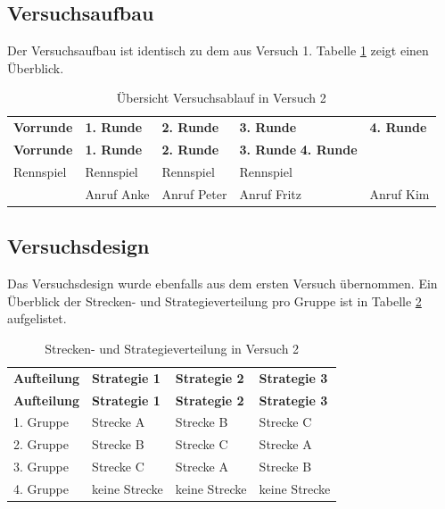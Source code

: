 \documentclass[12pt,a4paper]{scrartcl}
\begin{document}
\subsection{Versuchsaufbau}
Der Versuchsaufbau ist identisch zu dem aus Versuch 1.
Tabelle \ref{ablauf} zeigt einen Überblick.

\begin{longtable}{p{}p{}p{}p{}p{} }
	\label{ablauf}\\
	\caption[Übersicht Versuchsablauf in Versuch 2]{Übersicht Versuchsablauf in Versuch 2}\\
	\hline
	\textbf{Vorrunde}&\textbf{1. Runde}&\textbf{2. Runde} &\textbf{3. Runde} & \textbf{4. Runde}\\
	\hline
	\endfirsthead
	\hline
	\textbf{Vorrunde}&\textbf{1. Runde}&\textbf{2. Runde} &\textbf{3. Runde} \textbf{4. Runde}\\
	\hline
	\endhead
Rennspiel & Rennspiel & Rennspiel & Rennspiel &\\
 & Anruf Anke & Anruf Peter & Anruf Fritz & Anruf Kim \\
\hline
\end{longtable}

\subsection{Versuchsdesign}
Das Versuchsdesign wurde ebenfalls aus dem ersten Versuch übernommen.
Ein Überblick der Strecken- und Strategieverteilung pro Gruppe ist in Tabelle \ref{verteilung} aufgelistet. 

\begin{longtable}{p{3cm}p{3cm}p{3cm}p{3cm} }
	\label{verteilung}\\
	\caption[Strecken- und Strategieverteilung in Versuch 2]{Strecken- und Strategieverteilung in Versuch 2}\\
	\hline
	\textbf{Aufteilung}&\textbf{Strategie 1}&\textbf{Strategie 2} &\textbf{Strategie 3}\\
	\hline
	\endfirsthead
	\hline
	\textbf{Aufteilung}&\textbf{Strategie 1}&\textbf{Strategie 2} &\textbf{Strategie 3}\\
	\hline
	\endhead
1. Gruppe & Strecke A & Strecke B & Strecke C \\
2. Gruppe & Strecke B & Strecke C & Strecke A \\
3. Gruppe  & Strecke C & Strecke A & Strecke B \\
4. Gruppe   & keine Strecke & keine Strecke & keine Strecke\\ 
\hline
\end{longtable}
\end{document}
